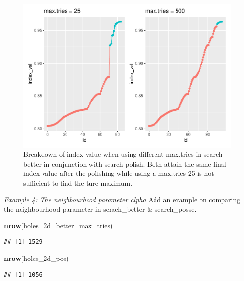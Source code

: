 \documentclass[12pt]{article}
\newenvironment{Shaded}{\begin{snugshade}}{\end{snugshade}}
\newcommand{\KeywordTok}[1]{\textcolor[rgb]{0.13,0.29,0.53}{\textbf{#1}}}
\newcommand{\NormalTok}[1]{#1}
\begin{document}
\begin{figure}
\centering
\includegraphics{paper_files/figure-latex/trace-compare-1.pdf}
\caption{\label{trace-compare}Breakdown of index value when using
different max.tries in search better in conjunction with search polish.
Both attain the same final index value after the polishing while using a
max.tries 25 is not sufficient to find the ture maximum.}
\end{figure}

\emph{Example 4: The neighbourhood parameter alpha} Add an example on
comparing the neighbourhood parameter in serach\_better \&
search\_posse.

\begin{Shaded}
\begin{Highlighting}[]
\KeywordTok{nrow}\NormalTok{(holes_2d_better_max_tries)}
\end{Highlighting}
\end{Shaded}

\begin{verbatim}
## [1] 1529
\end{verbatim}

\begin{Shaded}
\begin{Highlighting}[]
\KeywordTok{nrow}\NormalTok{(holes_2d_pos)}
\end{Highlighting}
\end{Shaded}

\begin{verbatim}
## [1] 1056
\end{verbatim}
\end{document}
